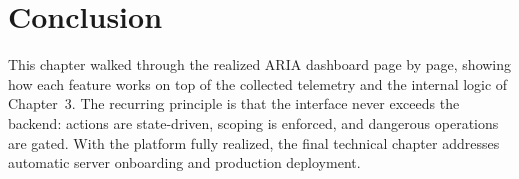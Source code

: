 \section{Conclusion}

This chapter walked through the realized ARIA dashboard page by page, showing how each feature works on top of the collected telemetry and the internal logic of Chapter~3. The recurring principle is that the interface never exceeds the backend: actions are state-driven, scoping is enforced, and dangerous operations are gated. With the platform fully realized, the final technical chapter addresses automatic server onboarding and production deployment.
